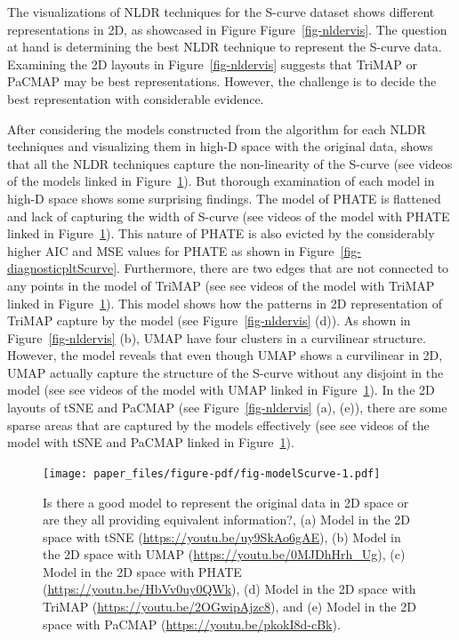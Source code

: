 \documentclass[
  12pt]{article}
\begin{document}
The visualizations of NLDR techniques for the S-curve dataset shows
different representations in 2D, as showcased in Figure
Figure~\ref{fig-nldervis}. The question at hand is determining the best
NLDR technique to represent the S-curve data. Examining the 2D layouts
in Figure~\ref{fig-nldervis} suggests that TriMAP or PaCMAP may be best
representations. However, the challenge is to decide the best
representation with considerable evidence.

After considering the models constructed from the algorithm for each
NLDR techniques and visualizing them in high-D space with the original
data, shows that all the NLDR techniques capture the non-linearity of
the S-curve (see videos of the models linked in
Figure~\ref{fig-modelScurve}). But thorough examination of each model in
high-D space shows some surprising findings. The model of PHATE is
flattened and lack of capturing the width of S-curve (see videos of the
model with PHATE linked in Figure~\ref{fig-modelScurve}). This nature of
PHATE is also evicted by the considerably higher AIC and MSE values for
PHATE as shown in Figure~\ref{fig-diagnosticpltScurve}. Furthermore,
there are two edges that are not connected to any points in the model of
TriMAP (see see videos of the model with TriMAP linked in
Figure~\ref{fig-modelScurve}). This model shows how the patterns in 2D
representation of TriMAP capture by the model (see
Figure~\ref{fig-nldervis} (d)). As shown in Figure~\ref{fig-nldervis}
(b), UMAP have four clusters in a curvilinear structure. However, the
model reveals that even though UMAP shows a curvilinear in 2D, UMAP
actually capture the structure of the S-curve without any disjoint in
the model (see see videos of the model with UMAP linked in
Figure~\ref{fig-modelScurve}). In the 2D layouts of tSNE and PaCMAP (see
Figure~\ref{fig-nldervis} (a), (e)), there are some sparse areas that
are captured by the models effectively (see see videos of the model with
tSNE and PaCMAP linked in Figure~\ref{fig-modelScurve}).

\begin{figure}

{\centering \texttt{[image: paper\_files/figure-pdf/fig-modelScurve-1.pdf]}

}

\caption{\label{fig-modelScurve}Is there a good model to represent the
original data in 2D space or are they all providing equivalent
information?, (a) Model in the 2D space with tSNE
(\url{https://youtu.be/uy9SkAo6gAE}), (b) Model in the 2D space with
UMAP (\url{https://youtu.be/0MJDhHrh_Ug}), (c) Model in the 2D space
with PHATE (\url{https://youtu.be/HbVv0uy0QWk}), (d) Model in the 2D
space with TriMAP (\url{https://youtu.be/2OGwipAjzc8}), and (e) Model in
the 2D space with PaCMAP (\url{https://youtu.be/pkokI8d-cBk}).}

\end{figure}
\end{document}
